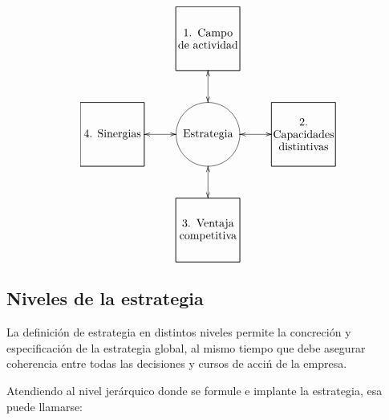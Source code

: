 \documentclass[10pt,a4paper,spanish]{report}
\begin{document}
                  \[\begin{xy}
                  ,(0,0)*+=[o]=<2cm>[F]\txt<2cm>{Estrategia}
                  ,(0,30)*+=[F]=<2cm>[F]\txt<2cm>{1. Campo de actividad}
                  ,(0,-30)*+=[F]=<2cm>[F]\txt<2cm>{3. Ventaja competitiva}
                  ,(30,0)*+=[F]=<2cm>[F]\txt<2cm>{2. Capacidades distintivas}
                  ,(-30,0)*+=[F]=<2cm>[F]\txt<2cm>{4. Sinergias}
                  \ar@{<->} (0,10);(0,20)
                  \ar@{<->} (0,-10);(0,-20)
                  \ar@{<->} (10,0);(20,0)
                  \ar@{<->} (-10,0);(-20,0)
                  \end{xy}\]
            \newpage
            \subsection{\textcolor[rgb]{0.4,0.9,0.6}Niveles de la estrategia}

                  La definición de estrategia en distintos niveles permite la concreción y especificación de la estrategia global, al mismo tiempo que debe asegurar coherencia entre todas las decisiones y cursos de acciń de la empresa.

                  Atendiendo al nivel jerárquico donde se formule e implante la estrategia, esa puede llamarse:
\end{document}
